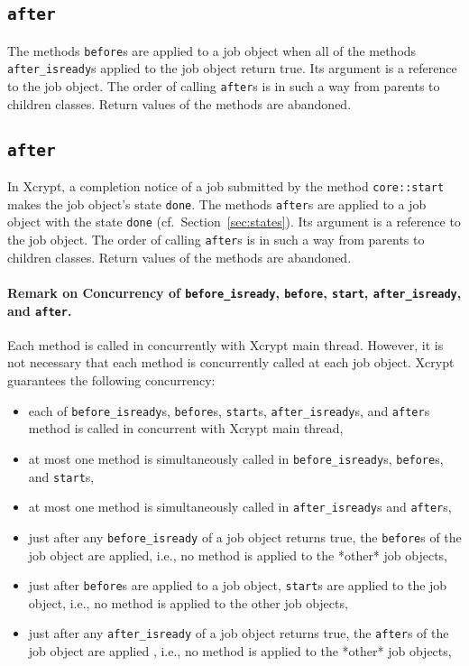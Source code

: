 \documentclass[a4paper,10pt]{report}
\def\|{\verb|} %|
\begin{document}
\subsection{\texttt{after}}

The methods \texttt{before}s are applied to a job object when all of
the methods \texttt{after\_isready}s applied to the job object return
true.  Its argument is a reference to the job object.  The order of
calling \texttt{after}s is in such a way from parents to children classes.
Return values of the methods are abandoned.
\fi

\subsection{\texttt{after}}

In Xcrypt, a completion notice of a job submitted by the method
 \|core::start| makes the job object's state \|done|.  The methods
 \texttt{after}s are applied to a job object with the state \|done|
 (cf.\ Section~\ref{sec:states}).  Its argument is a reference to the
 job object.  The order of calling \texttt{after}s is in such a way
 from parents to children classes.  Return values of the methods are
 abandoned.

\paragraph{Remark on Concurrency of \texttt{before\_isready}, \texttt{before}, \texttt{start}, \texttt{after\_isready}, and \texttt{after}.}
Each method is called in concurrently with Xcrypt main thread.
However, it is not necessary that each method is concurrently called
at each job object.  Xcrypt guarantees the following concurrency:
\begin{itemize}
  \item each of
	\texttt{before\_isready}s, \texttt{before}s, \texttt{start}s,
	\texttt{after\_isready}s, and \texttt{after}s
       method is called in concurrent with Xcrypt main thread,
  \item
    at most one method is simultaneously called in
	\texttt{before\_isready}s, \texttt{before}s, and
	\texttt{start}s,
  \item
    at most one method is simultaneously called in
	\texttt{after\_isready}s and \texttt{after}s,
  \item
       just after any \texttt{before\_isready} of a job object returns
	true, the \texttt{before}s of the job object are applied,
	i.e., no method is applied to the *other* job objects,
  \item
       just after \texttt{before}s are applied to a job object,
	\texttt{start}s are applied to the job object, i.e., no method
	is applied to the other job objects,
  \item
       just after any \texttt{after\_isready} of a job object returns
	true, the \texttt{after}s of the job object are applied ,
	i.e., no method is applied to the *other* job objects,
\end{itemize}
\fi
\end{document}
